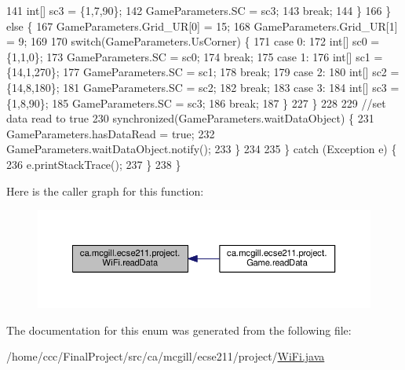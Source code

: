 \begin{DoxyCode}
141             \textcolor{keywordtype}{int}[] sc3 = \{1,7,90\};
142             GameParameters.SC = sc3;
143             \textcolor{keywordflow}{break};
144         \}
166       \} \textcolor{keywordflow}{else} \{
167         GameParameters.Grid\_UR[0] = 15;
168         GameParameters.Grid\_UR[1] = 9;
169  
170         \textcolor{keywordflow}{switch}(GameParameters.UsCorner) \{
171           \textcolor{keywordflow}{case} 0:
172             \textcolor{keywordtype}{int}[] sc0 = \{1,1,0\};
173             GameParameters.SC = sc0;
174             \textcolor{keywordflow}{break};
175           \textcolor{keywordflow}{case} 1:
176             \textcolor{keywordtype}{int}[] sc1 = \{14,1,270\};
177             GameParameters.SC = sc1;
178             \textcolor{keywordflow}{break};
179           \textcolor{keywordflow}{case} 2:
180             \textcolor{keywordtype}{int}[] sc2 = \{14,8,180\};
181             GameParameters.SC = sc2;
182             \textcolor{keywordflow}{break};
183           \textcolor{keywordflow}{case} 3:
184             \textcolor{keywordtype}{int}[] sc3 = \{1,8,90\};
185             GameParameters.SC = sc3;
186             \textcolor{keywordflow}{break};
187         \}
227       \}
228       
229       \textcolor{comment}{//set data read to true}
230       \textcolor{keyword}{synchronized}(GameParameters.waitDataObject) \{
231         GameParameters.hasDataRead = \textcolor{keyword}{true};
232         GameParameters.waitDataObject.notify();
233       \}
234       
235     \} \textcolor{keywordflow}{catch} (Exception e) \{
236       e.printStackTrace();
237     \}
238   \}
\end{DoxyCode}
Here is the caller graph for this function\+:\nopagebreak
\begin{figure}[H]
\begin{center}
\leavevmode
\includegraphics[width=350pt]{enumca_1_1mcgill_1_1ecse211_1_1project_1_1_wi_fi_a3488726983cda70dbde6f05c9c762f16_icgraph}
\end{center}
\end{figure}


The documentation for this enum was generated from the following file\+:\begin{DoxyCompactItemize}
\item 
/home/ccc/\+Final\+Project/src/ca/mcgill/ecse211/project/\hyperlink{_wi_fi_8java}{Wi\+Fi.\+java}\end{DoxyCompactItemize}
